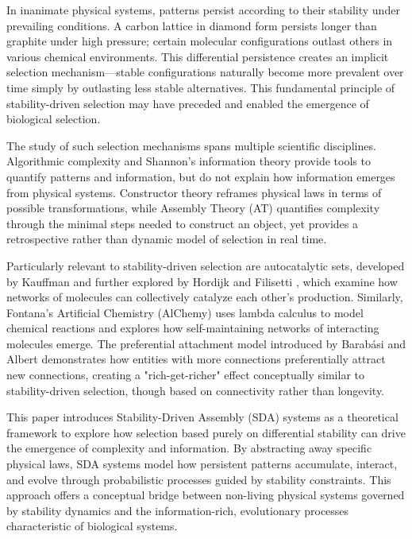 \documentclass[preprint,12pt]{elsarticle}
\begin{document}
In inanimate physical systems, patterns persist according to their stability under prevailing conditions. A carbon lattice in diamond form persists longer than graphite under high pressure; certain molecular configurations outlast others in various chemical environments. This differential persistence creates an implicit selection mechanism—stable configurations naturally become more prevalent over time simply by outlasting less stable alternatives. This fundamental principle of stability-driven selection may have preceded and enabled the emergence of biological selection.

The study of such selection mechanisms spans multiple scientific disciplines. Algorithmic complexity \cite{kolmogorov1965complexity} and Shannon's information theory \cite{shannon1948mathematical} provide tools to quantify patterns and information, but do not explain how information emerges from physical systems. Constructor theory \cite{deutsch2013constructor} reframes physical laws in terms of possible transformations, while Assembly Theory (AT) \cite{walker2023nature} quantifies complexity through the minimal steps needed to construct an object, yet provides a retrospective rather than dynamic model of selection in real time.

Particularly relevant to stability-driven selection are autocatalytic sets, developed by Kauffman \cite{kauffman1986autocatalytic} and further explored by Hordijk and Filisetti \cite{hordijk2011required}, which examine how networks of molecules can collectively catalyze each other's production. Similarly, Fontana's Artificial Chemistry (AlChemy) \cite{fontana1991algorithmic} uses lambda calculus to model chemical reactions and explores how self-maintaining networks of interacting molecules emerge. The preferential attachment model introduced by Barabási and Albert \cite{barabasi1999emergence} demonstrates how entities with more connections preferentially attract new connections, creating a "rich-get-richer" effect conceptually similar to stability-driven selection, though based on connectivity rather than longevity.

This paper introduces Stability-Driven Assembly (SDA) systems as a theoretical framework to explore how selection based purely on differential stability can drive the emergence of complexity and information. By abstracting away specific physical laws, SDA systems model how persistent patterns accumulate, interact, and evolve through probabilistic processes guided by stability constraints. This approach offers a conceptual bridge between non-living physical systems governed by stability dynamics and the information-rich, evolutionary processes characteristic of biological systems.
\end{document}
